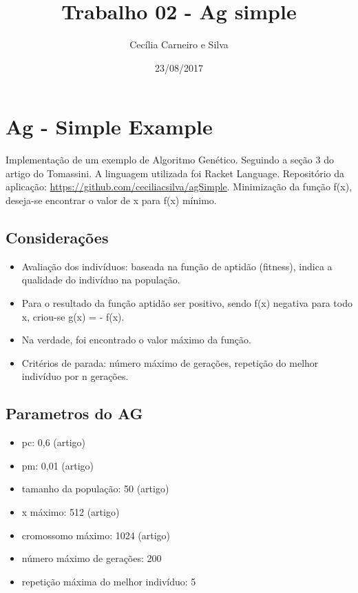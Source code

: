 \documentclass[11pt]{article}
\author{Cecília Carneiro e Silva}
\date{23/08/2017}
\title{Trabalho 02 - Ag simple}
\begin{document}
\maketitle

\section{Ag - Simple Example}
\label{sec-1}

Implementação de um exemplo de Algoritmo Genético. Seguindo a seção 3 do artigo do Tomassini. A linguagem utilizada foi Racket Language. Repositório da aplicação: \url{https://github.com/ceciliacsilva/agSimple}.
Minimização da função f(x), deseja-se encontrar o valor de x para f(x) mínimo.

\subsection{Considerações}
\label{sec-1-1}

\begin{itemize}
\item Avaliação dos indivíduos: baseada na função de aptidão (fitness), indica a qualidade do indivíduo na população.
\item Para o resultado da função aptidão ser positivo, sendo f(x) negativa para todo x, criou-se g(x) = - f(x).
\item Na verdade, foi encontrado o valor máximo da função.
\item Critérios de parada: número máximo de gerações, repetição do melhor indivíduo por n gerações.
\end{itemize}

\subsection{Parametros do AG}
\label{sec-1-2}

\begin{itemize}
\item pc: 0,6 (artigo)
\item pm: 0,01 (artigo)
\item tamanho da população: 50 (artigo)
\item x máximo: 512 (artigo)
\item cromossomo máximo: 1024 (artigo)
\item número máximo de gerações: 200
\item repetição máxima do melhor indivíduo: 5
\end{itemize}
\end{document}
